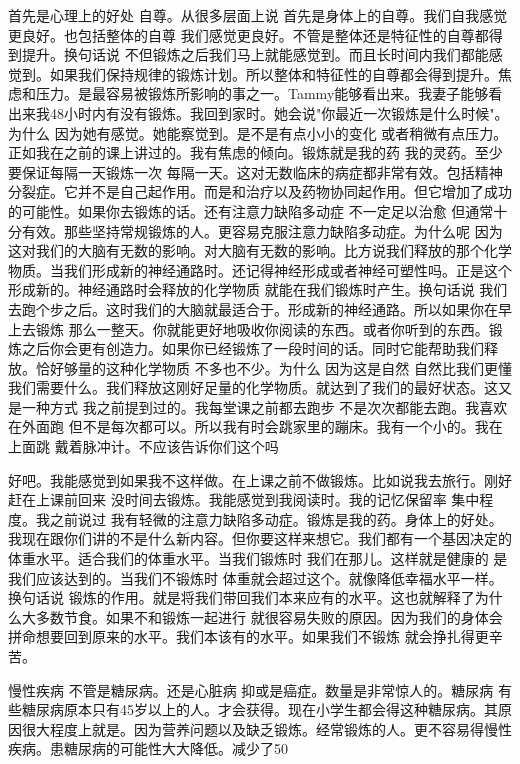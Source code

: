 首先是心理上的好处 自尊。从很多层面上说 首先是身体上的自尊。我们自我感觉更良好。也包括整体的自尊 我们感觉更良好。不管是整体还是特征性的自尊都得到提升。换句话说 不但锻炼之后我们马上就能感觉到。而且长时间内我们都能感觉到。如果我们保持规律的锻炼计划。所以整体和特征性的自尊都会得到提升。焦虑和压力。是最容易被锻炼所影响的事之一。Tammy能够看出来。我妻子能够看出来我48小时内有没有锻炼。我回到家时。她会说"你最近一次锻炼是什么时候"。为什么 因为她有感觉。她能察觉到。是不是有点小小的变化 或者稍微有点压力。正如我在之前的课上讲过的。我有焦虑的倾向。锻炼就是我的药 我的灵药。至少要保证每隔一天锻炼一次 每隔一天。这对无数临床的病症都非常有效。包括精神分裂症。它并不是自己起作用。而是和治疗以及药物协同起作用。但它增加了成功的可能性。如果你去锻炼的话。还有注意力缺陷多动症 不一定足以治愈 但通常十分有效。那些坚持常规锻炼的人。更容易克服注意力缺陷多动症。为什么呢 因为这对我们的大脑有无数的影响。对大脑有无数的影响。比方说我们释放的那个化学物质。当我们形成新的神经通路时。还记得神经形成或者神经可塑性吗。正是这个形成新的。神经通路时会释放的化学物质 就能在我们锻炼时产生。换句话说 我们去跑个步之后。这时我们的大脑就最适合于。形成新的神经通路。所以如果你在早上去锻炼 那么一整天。你就能更好地吸收你阅读的东西。或者你听到的东西。锻炼之后你会更有创造力。如果你已经锻炼了一段时间的话。同时它能帮助我们释放。恰好够量的这种化学物质 不多也不少。为什么 因为这是自然 自然比我们更懂我们需要什么。我们释放这刚好足量的化学物质。就达到了我们的最好状态。这又是一种方式 我之前提到过的。我每堂课之前都去跑步 不是次次都能去跑。我喜欢在外面跑 但不是每次都可以。所以我有时会跳家里的蹦床。我有一个小的。我在上面跳 戴着脉冲计。不应该告诉你们这个吗 

好吧。我能感觉到如果我不这样做。在上课之前不做锻炼。比如说我去旅行。刚好赶在上课前回来 没时间去锻炼。我能感觉到我阅读时。我的记忆保留率 集中程度。我之前说过 我有轻微的注意力缺陷多动症。锻炼是我的药。身体上的好处。我现在跟你们讲的不是什么新内容。但你要这样来想它。我们都有一个基因决定的体重水平。适合我们的体重水平。当我们锻炼时 我们在那儿。这样就是健康的 是我们应该达到的。当我们不锻炼时 体重就会超过这个。就像降低幸福水平一样。换句话说 锻炼的作用。就是将我们带回我们本来应有的水平。这也就解释了为什么大多数节食。如果不和锻炼一起进行 就很容易失败的原因。因为我们的身体会拼命想要回到原来的水平。我们本该有的水平。如果我们不锻炼 就会挣扎得更辛苦。 

慢性疾病 不管是糖尿病。还是心脏病 抑或是癌症。数量是非常惊人的。糖尿病 有些糖尿病原本只有45岁以上的人。才会获得。现在小学生都会得这种糖尿病。其原因很大程度上就是。因为营养问题以及缺乏锻炼。经常锻炼的人。更不容易得慢性疾病。患糖尿病的可能性大大降低。减少了50%

